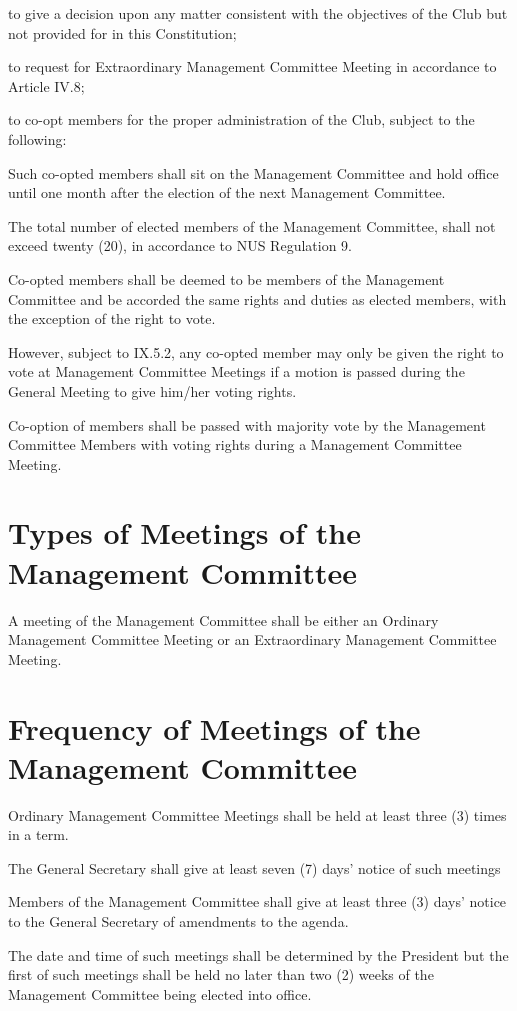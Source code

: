 \begin{legal}
\begin{legal}
		\end{legal}
	\item to give a decision upon any matter consistent with the objectives of the Club but not provided for in this Constitution;
	\item to request for Extraordinary Management Committee Meeting in accordance to Article IV.8;
	\item to co-opt members for the proper administration of the Club, subject to the following:
		\begin{legal}
		\item Such co-opted members shall sit on the Management Committee and hold office until one month after the election of the next Management Committee.
		\item The total number of elected members of the Management Committee, shall not exceed twenty (20), in accordance to NUS Regulation 9.
		\item Co-opted members shall be deemed to be members of the Management Committee and be accorded the same rights and duties as elected members, with the exception of the right to vote.
		\item However, subject to IX.5.2, any co-opted member may only be given the right to vote at Management Committee Meetings if a motion is passed during the General Meeting to give him/her voting rights.
		\item Co-option of members shall be passed with majority vote by the Management Committee Members with voting rights during a Management Committee Meeting.
		\end{legal}
	\end{legal}

\section{Types of Meetings of the Management Committee}
A meeting of the Management Committee shall be either an Ordinary Management Committee Meeting or an Extraordinary Management Committee Meeting.

\section{Frequency of Meetings of the Management Committee}
Ordinary Management Committee Meetings shall be held at least three (3) times in a term.
	\begin{legal}
	\item The General Secretary shall give at least seven (7) days' notice of such meetings
	\item Members of the Management Committee shall give at least three (3) days' notice to the General Secretary of amendments to the agenda.
	\item The date and time of such meetings shall be determined by the President but the first of such meetings shall be held no later than two (2) weeks of the Management Committee being elected into office.
	\end{legal}

